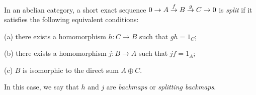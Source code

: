 \documentclass[12pt]{article}
\begin{document}
In an abelian category, a short exact sequence
$0 \to A \buildrel f \over \to B \buildrel g \over \to C \to 0$
is {\it split}
if it satisfies the following equivalent conditions:

(a) there exists a homomorphism $h : C \to B$ such that $gh = 1_C$;

(b) there exists a homomorphism $j : B \to A$ such that $jf = 1_A$;

(c) $B$ is isomorphic to the direct sum $A \oplus C$.

In this case, we say that $h$ and $j$ 
are {\it backmaps} or {\it splitting backmaps}.
\end{document}
